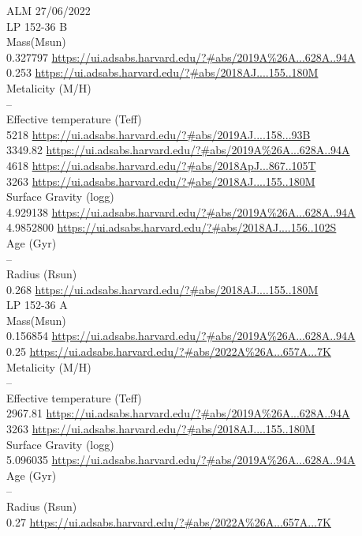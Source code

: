 ALM 27/06/2022\\
LP 152-36 B\\
Mass(Msun)\\
0.327797 \url{https://ui.adsabs.harvard.edu/?#abs/2019A%26A...628A..94A}\\
0.253 \url{https://ui.adsabs.harvard.edu/?#abs/2018AJ....155..180M}\\
Metalicity (M/H)\\
--\\
Effective temperature (Teff) \\
5218 \url{https://ui.adsabs.harvard.edu/?#abs/2019AJ....158...93B}\\
3349.82 \url{https://ui.adsabs.harvard.edu/?#abs/2019A%26A...628A..94A}\\
4618 \url{https://ui.adsabs.harvard.edu/?#abs/2018ApJ...867..105T}\\
3263 \url{https://ui.adsabs.harvard.edu/?#abs/2018AJ....155..180M}\\
Surface Gravity (logg) \\
4.929138 \url{https://ui.adsabs.harvard.edu/?#abs/2019A%26A...628A..94A}\\
4.9852800 \url{https://ui.adsabs.harvard.edu/?#abs/2018AJ....156..102S}\\
Age (Gyr)\\
--\\
Radius (Rsun)\\
0.268 \url{https://ui.adsabs.harvard.edu/?#abs/2018AJ....155..180M}\\
LP 152-36 A\\
Mass(Msun)\\
0.156854 \url{https://ui.adsabs.harvard.edu/?#abs/2019A%26A...628A..94A}\\
0.25 \url{https://ui.adsabs.harvard.edu/?#abs/2022A%26A...657A...7K}\\
Metalicity (M/H)\\
--\\
Effective temperature (Teff) \\
2967.81 \url{https://ui.adsabs.harvard.edu/?#abs/2019A%26A...628A..94A}\\
3263 \url{https://ui.adsabs.harvard.edu/?#abs/2018AJ....155..180M}\\
Surface Gravity (logg) \\
5.096035 \url{https://ui.adsabs.harvard.edu/?#abs/2019A%26A...628A..94A}\\
Age (Gyr)\\
--\\
Radius (Rsun)\\
0.27 \url{https://ui.adsabs.harvard.edu/?#abs/2022A%26A...657A...7K}\\
